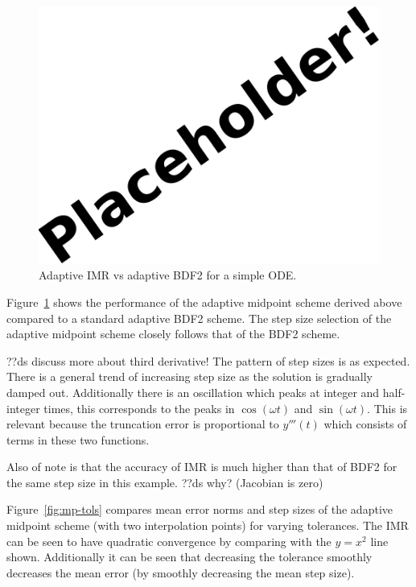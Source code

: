 \begin{figure}[ht!]
  \centering
  \includegraphics{images/placeholder}
  \caption{Adaptive IMR vs adaptive BDF2 for a simple ODE.}
  \label{fig:mp-vs-bdf2}
\end{figure}

Figure~\ref{fig:mp-vs-bdf2} shows the performance of the adaptive midpoint scheme derived above compared to a standard adaptive BDF2 scheme.\cite[pg. 715]{Gresho-Sani}
The step size selection of the adaptive midpoint scheme closely follows that of the BDF2 scheme.


??ds discuss more about third derivative!
The pattern of step sizes is as expected.
There is a general trend of increasing step size as the solution is gradually damped out.
Additionally there is an oscillation which peaks at integer and half-integer times, this corresponds to the peaks in $\cos(\omega t)$ and $\sin(\omega t)$.
This is relevant because the truncation error is proportional to $y'''(t)$ which consists of terms in these two functions.

Also of note is that the accuracy of IMR is much higher than that of BDF2 for the same step size in this example.
??ds why? (Jacobian is zero)


Figure~\ref{fig:mp-tols} compares mean error norms and step sizes of the adaptive midpoint scheme (with two interpolation points) for varying tolerances.
The IMR can be seen to have quadratic convergence by comparing with the $y=x^2$ line shown.
Additionally it can be seen that decreasing the tolerance smoothly decreases the mean error (by smoothly decreasing the mean step size).

